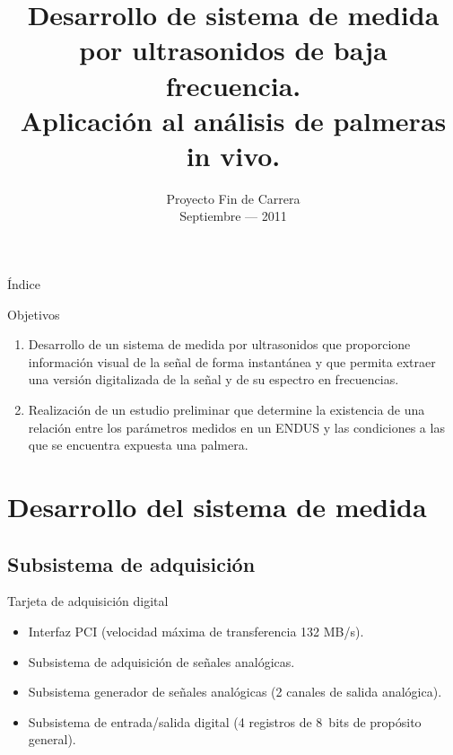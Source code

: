\documentclass[utf8, compress]			{beamer}
\title[ENDUS: Sistema de medida y aplicación en palmeras in vivo.]{
    Desarrollo de sistema de medida por ultrasonidos de baja frecuencia. \\
    Aplicación al análisis de palmeras in vivo.
}
\author[José Ramón Gisbert Valls]{
    \vbox{
	\makebox[\director][r]{AUTOR: José Ramón Gisbert Valls}
	\makebox[\director][r]{DIRECTOR: Alberto Rodríguez Martínez}
    }
}
\institute[Universidad Miguel Hernández de Elche]{
    Universidad Miguel Hernández de Elche \medskip\par
    Escuela Politécnica Superior de Elche
}
\date[Septiembre --- 2011]{
    Proyecto Fin de Carrera \\
    Septiembre --- 2011
}
\begin{document}
\frame[plain]{\titlepage}

\begin{frame}{Índice}
    \tableofcontents
\end{frame}

\begin{frame}{Objetivos}
    \begin{enumerate}
	\item Desarrollo de un \alert{sistema de medida por ultrasonidos}
	    que proporcione información visual de la señal de forma
	    instantánea y que permita extraer una versión digitalizada de
	    la señal y de su espectro en frecuencias.
	\item Realización de un \alert{estudio preliminar} que determine la
	    existencia de una relación entre los parámetros medidos en un
	    ENDUS y las condiciones a las que se encuentra expuesta una
	    palmera.
    \end{enumerate}
\end{frame}


\section{Desarrollo del sistema de medida}

% 


\subsection{Subsistema de adquisición}

\begin{frame}{Tarjeta de adquisición digital}
    \begin{itemize}
	\item Interfaz PCI (velocidad máxima de transferencia 132 MB/s).
	\item Subsistema de adquisición de señales analógicas.
	\item Subsistema generador de señales analógicas (2 canales de
	    salida analógica).
	\item Subsistema de entrada/salida digital (4 registros de 8~bits
	    de propósito general).
    \end{itemize}
\end{frame}
\end{document}
